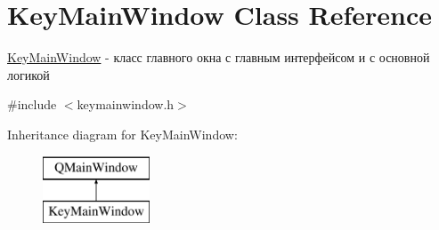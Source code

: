 \hypertarget{class_key_main_window}{}\section{Key\+Main\+Window Class Reference}
\label{class_key_main_window}


\hyperlink{class_key_main_window}{Key\+Main\+Window} -\/ класс главного окна с главным интерфейсом и с основной логикой  




{\ttfamily \#include $<$keymainwindow.\+h$>$}

Inheritance diagram for Key\+Main\+Window\+:\begin{figure}[H]
\begin{center}
\leavevmode
\includegraphics[height=2.000000cm]{class_key_main_window}
\end{center}
\end{figure}
